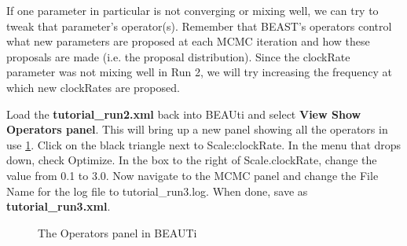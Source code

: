 \documentclass[11pt]{article}
\begin{document}
If one parameter in particular is not converging or mixing well, we can try to tweak that parameter's operator(s). Remember that BEAST's operators control what new parameters are proposed at each MCMC iteration and how these proposals are made (i.e. the proposal distribution). Since the clockRate parameter was not mixing well in Run 2, we will try increasing the frequency at which new clockRates are proposed.

\begin{framed}
Load the \textbf{tutorial\_run2.xml} back into BEAUti and select \textbf{View \textrightarrow Show Operators panel}. This will bring up a new panel showing all the operators in use \ref{fig:beauti_run3}. Click on the black triangle next to Scale:clockRate. In the menu that drops down, check Optimize. In the box to the right of Scale.clockRate, change the value from 0.1 to 3.0. Now navigate to the MCMC panel and change the File Name for the log file to tutorial\_run3.log. When done, save as \textbf{tutorial\_run3.xml}.
\end{framed}

\begin{figure}[!h]
\centering
{}
\caption{\small The Operators panel in BEAUTi}
\label{fig:beauti_run3}
\end{figure} 
\end{document}
